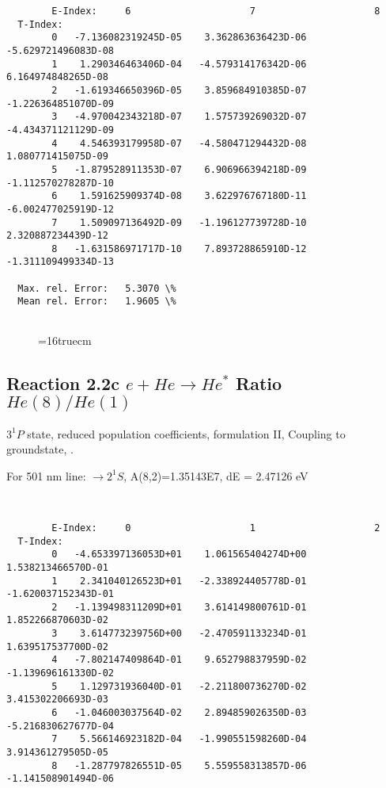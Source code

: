 \documentclass[12pt,dvipdfmx]{article}
\begin{document}
{\begin{small}
\begin{verbatim}
        E-Index:     6                     7                     8
  T-Index:
        0   -7.136082319245D-05    3.362863636423D-06   -5.629721496083D-08
        1    1.290346463406D-04   -4.579314176342D-06    6.164974848265D-08
        2   -1.619346650396D-05    3.859684910385D-07   -1.226364851070D-09
        3   -4.970042343218D-07    1.575739269032D-07   -4.434371121129D-09
        4    4.546393179958D-07   -4.580471294432D-08    1.080771415075D-09
        5   -1.879528911353D-07    6.906966394218D-09   -1.112570278287D-10
        6    1.591625909374D-08    3.622976767180D-11   -6.002477025919D-12
        7    1.509097136492D-09   -1.196127739728D-10    2.320887234439D-12
        8   -1.631586971717D-10    7.893728865910D-12   -1.311109499334D-13

  Max. rel. Error:   5.3070 \%
  Mean rel. Error:   1.9605 \%


\end{verbatim}\end{small}
\begin{figure} \label{2.2b}
\epsfxsize=16truecm
\end{figure}
\newpage


\subsection{
  Reaction 2.2c $e + He \rightarrow He^*  $ Ratio $He(8)/He(1)$
}

  $3^1P$ state,
  reduced population coefficients, formulation II,
  Coupling to groundstate, \cite{kn:Fujimoto}.

  For 501 nm line: $\rightarrow 2^1S$, A(8,2)=1.35143E7, dE = 2.47126 eV

\begin{small}\begin{verbatim}


        E-Index:     0                     1                     2
  T-Index:
        0   -4.653397136053D+01    1.061565404274D+00    1.538213466570D-01
        1    2.341040126523D+01   -2.338924405778D-01   -1.620037152343D-01
        2   -1.139498311209D+01    3.614149800761D-01    1.852266870603D-02
        3    3.614773239756D+00   -2.470591133234D-01    1.639517537700D-02
        4   -7.802147409864D-01    9.652798837959D-02   -1.139696161330D-02
        5    1.129731936040D-01   -2.211800736270D-02    3.415302206693D-03
        6   -1.046003037564D-02    2.894859026350D-03   -5.216830627677D-04
        7    5.566146923182D-04   -1.990551598260D-04    3.914361279505D-05
        8   -1.287797826551D-05    5.559558313857D-06   -1.141508901494D-06


\end{verbatim}
\end{small}}
\end{document}
